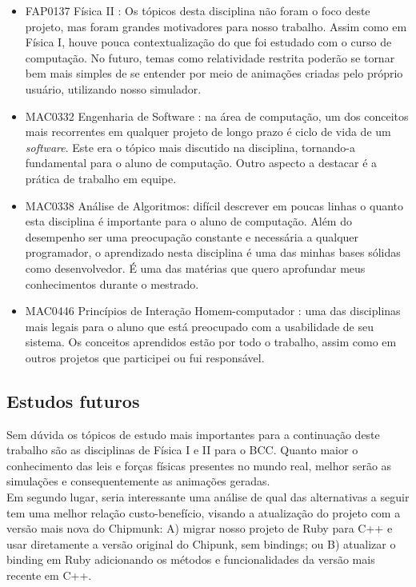 \begin{itemize}
\item FAP0137 	Física II : Os tópicos desta disciplina não foram o foco deste projeto, mas foram grandes motivadores para nosso trabalho. Assim como em Física I, houve pouca contextualização do que foi estudado com o curso de computação. No futuro, temas como relatividade restrita poderão se tornar bem mais simples de se entender por meio de animações criadas pelo próprio usuário, utilizando nosso simulador.
 
\item MAC0332 	Engenharia de Software : na área de computação, um dos conceitos mais recorrentes em qualquer projeto de longo prazo é ciclo de vida de um \textit{software}. Este era o tópico mais discutido na disciplina, tornando-a fundamental para o aluno de computação. Outro aspecto a destacar é a prática de trabalho em equipe.

\item MAC0338 	Análise de Algoritmos: difícil descrever em poucas linhas o quanto esta disciplina é importante para o aluno de computação. Além do desempenho ser uma preocupação constante e necessária a qualquer programador, o aprendizado nesta disciplina é uma das minhas bases sólidas como desenvolvedor. É uma das matérias que quero aprofundar meus conhecimentos durante o mestrado.

\item MAC0446 	Princípios de Interação Homem-computador : uma das disciplinas mais legais para o aluno que está preocupado com a usabilidade de seu sistema. Os conceitos aprendidos estão por todo o trabalho, assim como em outros projetos que participei ou fui responsável.

\end{itemize}
\subsection{Estudos futuros} 
Sem dúvida os tópicos de estudo mais importantes para a continuação deste trabalho são as disciplinas de Física I e II para o BCC. Quanto maior o conhecimento das leis e forças físicas presentes no mundo real, melhor serão as simulações e consequentemente as animações geradas.\\

Em segundo lugar, seria interessante uma análise de qual das alternativas a seguir tem uma melhor relação custo-benefício, visando a atualização do projeto com a versão mais nova do Chipmunk: A) migrar nosso projeto de Ruby para C++ e usar diretamente a versão original do Chipunk, sem bindings; ou B) atualizar o binding em Ruby adicionando os métodos e funcionalidades da versão mais recente em C++.\\

